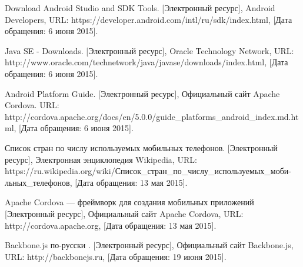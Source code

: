 \begin{thebibliography}{30}
 Download Android Studio and SDK Tools. [Электронный ресурс], Android Developers, URL: https://developer.android.com/intl/ru/sdk/index.html, [Дата обращения: 6 июня 2015].

 Java SE - Downloads. [Электронный ресурс], Oracle Technology Network, URL: http://www.oracle.com/technetwork/java/javase/downloads/index.html, [Дата обращения: 6 июня 2015].

 Android Platform Guide. [Электронный ресурс],  Официальный сайт Apache Cordova. URL: http://cordova.apache.org/docs/en/5.0.0/guide\_platforms\_android\_index.md.html, [Дата обращения: 6 июня 2015].

 Список стран по числу используемых мобильных телефонов. [Электронный ресурс], Электронная энциклопедия Wikipedia, URL: https://ru.wikipedia.org/wiki/Список\_стран\_по\_числу\_используемых\_моби- льных\_телефонов, [Дата обращения: 13 мая 2015].

 Apache Cordova --- фреймворк для создания мобильных приложений [Электронный ресурс], Официальный сайт Apache Cordova, URL: http://cordova.apache.org, [Дата обращения: 13 мая 2015].

 Backbone.js по-русски . [Электронный ресурс], Официальный сайт Backbone.js, URL: http://backbonejs.ru, [Дата обращения: 19 июня 2015].


\end{thebibliography}

